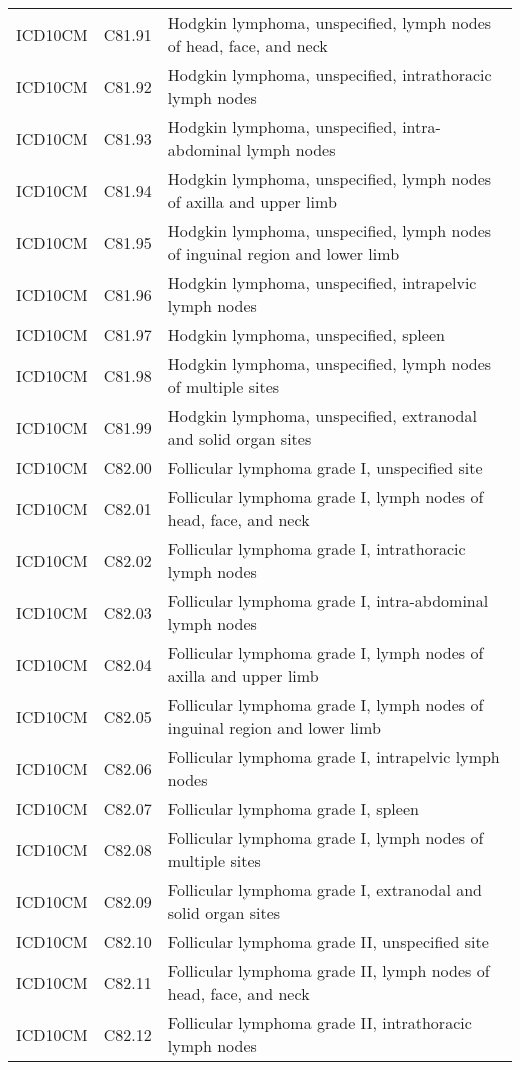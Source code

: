 \begin{longtable}{p{}p{}p{}}
  ICD10CM & C81.91 & Hodgkin lymphoma, unspecified, lymph nodes of head, face, and neck \\ 
  ICD10CM & C81.92 & Hodgkin lymphoma, unspecified, intrathoracic lymph nodes \\ 
  ICD10CM & C81.93 & Hodgkin lymphoma, unspecified, intra-abdominal lymph nodes \\ 
  ICD10CM & C81.94 & Hodgkin lymphoma, unspecified, lymph nodes of axilla and upper limb \\ 
  ICD10CM & C81.95 & Hodgkin lymphoma, unspecified, lymph nodes of inguinal region and lower limb \\ 
  ICD10CM & C81.96 & Hodgkin lymphoma, unspecified, intrapelvic lymph nodes \\ 
  ICD10CM & C81.97 & Hodgkin lymphoma, unspecified, spleen \\ 
  ICD10CM & C81.98 & Hodgkin lymphoma, unspecified, lymph nodes of multiple sites \\ 
  ICD10CM & C81.99 & Hodgkin lymphoma, unspecified, extranodal and solid organ sites \\ 
  ICD10CM & C82.00 & Follicular lymphoma grade I, unspecified site \\ 
  ICD10CM & C82.01 & Follicular lymphoma grade I, lymph nodes of head, face, and neck \\ 
  ICD10CM & C82.02 & Follicular lymphoma grade I, intrathoracic lymph nodes \\ 
  ICD10CM & C82.03 & Follicular lymphoma grade I, intra-abdominal lymph nodes \\ 
  ICD10CM & C82.04 & Follicular lymphoma grade I, lymph nodes of axilla and upper limb \\ 
  ICD10CM & C82.05 & Follicular lymphoma grade I, lymph nodes of inguinal region and lower limb \\ 
  ICD10CM & C82.06 & Follicular lymphoma grade I, intrapelvic lymph nodes \\ 
  ICD10CM & C82.07 & Follicular lymphoma grade I, spleen \\ 
  ICD10CM & C82.08 & Follicular lymphoma grade I, lymph nodes of multiple sites \\ 
  ICD10CM & C82.09 & Follicular lymphoma grade I, extranodal and solid organ sites \\ 
  ICD10CM & C82.10 & Follicular lymphoma grade II, unspecified site \\ 
  ICD10CM & C82.11 & Follicular lymphoma grade II, lymph nodes of head, face, and neck \\ 
  ICD10CM & C82.12 & Follicular lymphoma grade II, intrathoracic lymph nodes \\ 

\end{longtable}
